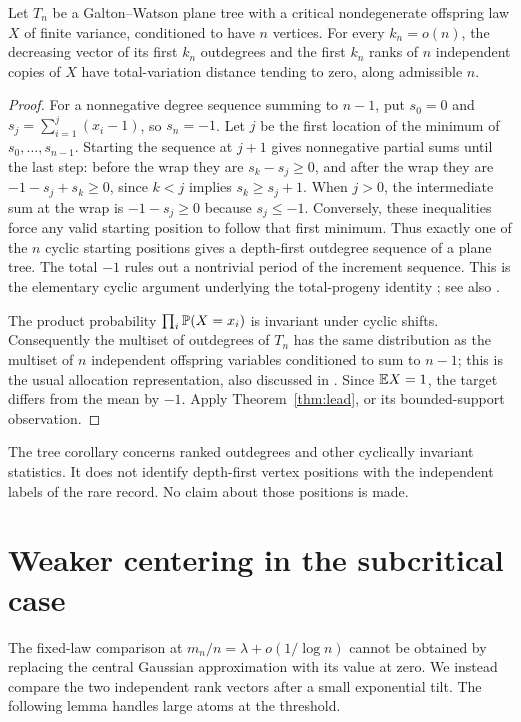 \begin{corollary}\label{cor:tree}
Let $T_n$ be a Galton--Watson plane tree with a critical nondegenerate offspring law $X$ of finite variance, conditioned to have $n$ vertices. For every $k_n=o(n)$, the decreasing vector of its first $k_n$ outdegrees and the first $k_n$ ranks of $n$ independent copies of $X$ have total-variation distance tending to zero, along admissible $n$.
\end{corollary}
\begin{proof}
For a nonnegative degree sequence summing to $n-1$, put $s_0=0$ and $s_j=\sum_{i=1}^j(x_i-1)$, so $s_n=-1$. Let $j$ be the first location of the minimum of $s_0,\ldots,s_{n-1}$. Starting the sequence at $j+1$ gives nonnegative partial sums until the last step: before the wrap they are $s_k-s_j\ge0$, and after the wrap they are $-1-s_j+s_k\ge0$, since $k<j$ implies $s_k\ge s_j+1$. When $j>0$, the intermediate sum at the wrap is $-1-s_j\ge0$ because $s_j\le-1$. Conversely, these inequalities force any valid starting position to follow that first minimum. Thus exactly one of the $n$ cyclic starting positions gives a depth-first outdegree sequence of a plane tree. The total $-1$ rules out a nontrivial period of the increment sequence. This is the elementary cyclic argument underlying the total-progeny identity \cite{Dwass}; see also \cite[Section~15]{Janson}.

The product probability $\prod_i\mathbb P(X=x_i)$ is invariant under cyclic shifts. Consequently the multiset of outdegrees of $T_n$ has the same distribution as the multiset of $n$ independent offspring variables conditioned to sum to $n-1$; this is the usual allocation representation, also discussed in \cite[Section~15]{Janson}. Since $\mathbb E X=1$, the target differs from the mean by $-1$. Apply Theorem~\ref{thm:lead}, or its bounded-support observation.
\end{proof}
\begin{remark}
The tree corollary concerns ranked outdegrees and other cyclically invariant statistics. It does not identify depth-first vertex positions with the independent labels of the rare record. No claim about those positions is made.
\end{remark}

\section{Weaker centering in the subcritical case}\label{sec:weak}
The fixed-law comparison at $m_n/n=\lambda+o(1/\log n)$ cannot be obtained by replacing the central Gaussian approximation with its value at zero. We instead compare the two independent rank vectors after a small exponential tilt. The following lemma handles large atoms at the threshold.

